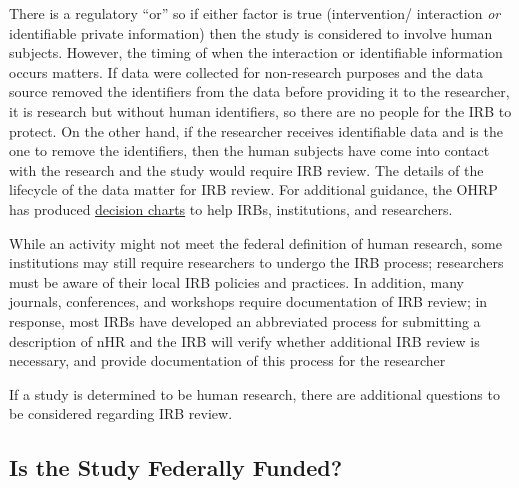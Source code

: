 There is a regulatory ``or'' so if either factor is true (intervention/ interaction \emph{or} identifiable private information) then the study is considered to involve human subjects. However, the timing of when the interaction or identifiable information occurs matters. If data were collected for non-research purposes and the data source removed the identifiers from the data before providing it to the researcher, it is research but without human identifiers, so there are no people for the IRB to protect. On the other hand, if the researcher receives identifiable data and is the one to remove the identifiers, then the human subjects have come into contact with the research and the study would require IRB review. The details of the lifecycle of the data matter for IRB review. For additional guidance, the OHRP has produced \href{https://www.hhs.gov/ohrp/regulations-and-policy/decision-charts/index.html}{decision charts} to help IRBs, institutions, and researchers.

While an activity might not meet the federal definition of human research, some institutions may still require researchers to undergo the IRB process; researchers must be aware of their local IRB policies and practices. In addition, many journals, conferences, and workshops require documentation of IRB review; in response, most IRBs have developed an abbreviated process for submitting a description of nHR and the IRB will verify whether additional IRB review is necessary, and provide documentation of this process for the researcher

If a study is determined to be human research, there are additional questions to be considered regarding IRB review.

\hypertarget{is-the-study-federally-funded}{%
\subsection{Is the Study Federally Funded?}\label{is-the-study-federally-funded}}

